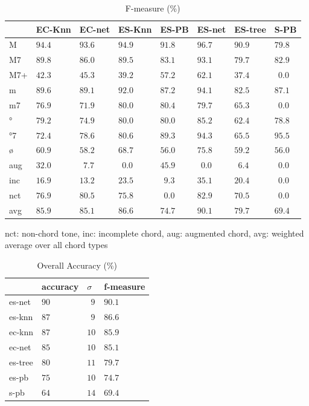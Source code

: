 \documentclass{article}
\begin{document}
\begin{table}
  \centering
  \begin{tabular}{l|p{.5cm}p{.5cm}p{.5cm}p{.5cm}p{.5cm}p{.5cm}p{.5cm}}
         
   &EC-Knn &EC-net &ES-Knn &ES-PB  &ES-net &ES-tree&S-PB   \\
\hline                                            
M  &$ 94.4$&$ 93.6$&$ 94.9$&$ 91.8$&$ 96.7$&$ 90.9$&$ 79.8$\\
M7 &$ 89.8$&$ 86.0$&$ 89.5$&$ 83.1$&$ 93.1$&$ 79.7$&$ 82.9$\\
M7+&$ 42.3$&$ 45.3$&$ 39.2$&$ 57.2$&$ 62.1$&$ 37.4$&$~~0.0$\\
m  &$ 89.6$&$ 89.1$&$ 92.0$&$ 87.2$&$ 94.1$&$ 82.5$&$ 87.1$\\
m7 &$ 76.9$&$ 71.9$&$ 80.0$&$ 80.4$&$ 79.7$&$ 65.3$&$~~0.0$\\
°  &$ 79.2$&$ 74.9$&$ 80.0$&$ 80.0$&$ 85.2$&$ 62.4$&$ 78.8$\\
°7 &$ 72.4$&$ 78.6$&$ 80.6$&$ 89.3$&$ 94.3$&$ 65.5$&$ 95.5$\\
ø  &$ 60.9$&$ 58.2$&$ 68.7$&$ 56.0$&$ 75.8$&$ 59.2$&$ 56.0$\\
aug&$ 32.0$&$~~7.7$&$~~0.0$&$ 45.9$&$~~0.0$&$~~6.4$&$~~0.0$\\
inc&$ 16.9$&$ 13.2$&$ 23.5$&$~~9.3$&$ 35.1$&$ 20.4$&$~~0.0$\\
nct&$ 76.9$&$ 80.5$&$ 75.8$&$~~0.0$&$ 82.9$&$ 70.5$&$~~0.0$\\
avg&$ 85.9$&$ 85.1$&$ 86.6$&$ 74.7$&$ 90.1$&$ 79.7$&$ 69.4$\\

  \end{tabular}                                                        

\medskip

nct: non-chord tone, inc: incomplete chord, aug: augmented chord, avg:
weighted average over all chord types
  \caption{F-measure (\%)}
  \label{tab:f-measure}
\end{table}



\begin{table}
  \centering
  \begin{tabular}{l|p{1.5cm}p{.5cm}p{1.5cm}}
       & accuracy& $\sigma$  & f-measure\\
\hline
es-net &$   90  $&$~~9$      &$90.1$ \\
es-knn &$   87  $&$~~9$      &$86.6$ \\
ec-knn &$   87  $&$ 10$      &$85.9$ \\
ec-net &$   85  $&$ 10$      &$85.1$ \\
es-tree&$   80  $&$ 11$      &$79.7$ \\
es-pb  &$   75  $&$ 10$      &$74.7$ \\
s-pb   &$   64  $&$ 14$      &$69.4$ \\

  \end{tabular}                                                        

\medskip

  \caption{Overall Accuracy (\%)}
  \label{tab:accuracy}
\end{table}
\end{document}
